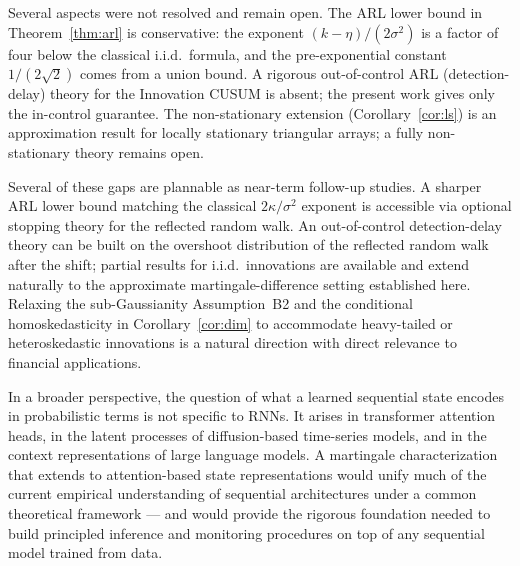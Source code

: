 \documentclass[bj,authoryear]{imsart}
\theoremstyle{plain}
\theoremstyle{definition}
\begin{document}
Several aspects were not resolved and remain open.
The ARL lower bound in Theorem~\ref{thm:arl} is conservative: the exponent
$(k-\eta)/(2\sigma^2)$ is a factor of four below the classical i.i.d.\
formula, and the pre-exponential constant $1/(2\sqrt{2})$ comes from a union
bound.
A rigorous out-of-control ARL (detection-delay) theory for the Innovation
CUSUM is absent; the present work gives only the in-control guarantee.
The non-stationary extension (Corollary~\ref{cor:ls}) is an approximation
result for locally stationary triangular arrays; a fully non-stationary
theory remains open.

Several of these gaps are plannable as near-term follow-up studies.
A sharper ARL lower bound matching the classical $2\kappa/\sigma^2$ exponent
is accessible via optional stopping theory for the reflected random walk.
An out-of-control detection-delay theory can be built on the overshoot
distribution of the reflected random walk after the shift; partial results
for i.i.d.\ innovations are available and extend naturally to the approximate
martingale-difference setting established here.
Relaxing the sub-Gaussianity Assumption~B2 and the conditional homoskedasticity
in Corollary~\ref{cor:dim} to accommodate heavy-tailed or heteroskedastic
innovations is a natural direction with direct relevance to financial applications.

In a broader perspective, the question of what a learned sequential state
encodes in probabilistic terms is not specific to RNNs.
It arises in transformer attention heads, in the latent processes of
diffusion-based time-series models, and in the context representations of
large language models.
A martingale characterization that extends to attention-based state
representations would unify much of the current empirical understanding of
sequential architectures under a common theoretical framework --- and would
provide the rigorous foundation needed to build principled inference and
monitoring procedures on top of any sequential model trained from data.




\end{document}
